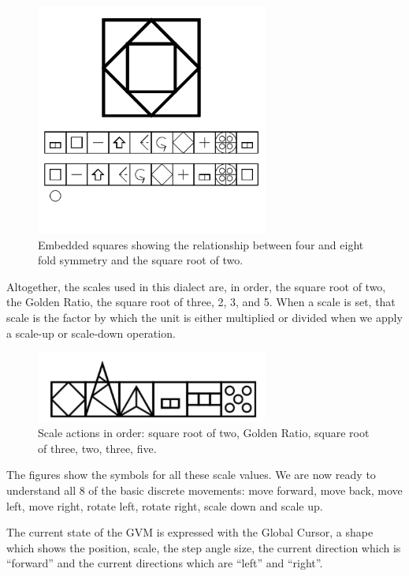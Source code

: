 \begin{figure}
	\centering
	\includegraphics[width=3in]{figures/symbol/squareroottwo.png}
	\caption[squareroottwo]
	{Embedded squares showing the relationship between four and eight fold symmetry and the square root of two.}
\end{figure}

Altogether, the scales used in this dialect are, in order, the square root of two, the Golden Ratio, the square root of three, 2, 3, and 5.  When a scale is set, that scale is the factor by which the unit is either multiplied or divided when we apply a scale-up or scale-down operation.  


\begin{figure}
	\centering
	\includegraphics[width=3in]{figures/symbol/scales.png}
	\caption[scales]
	{Scale actions in order: square root of two, Golden Ratio, square root of three, two, three, five.}
\end{figure}


The figures show the symbols for all these scale values.  We are now ready to understand all 8 of the basic discrete movements: move forward, move back, move left, move right, rotate left, rotate right, scale down and scale up.     

The current state of the GVM is expressed with the Global Cursor, a shape which shows the position, scale, the step angle size, the current direction which is ``forward'' and the current directions which are ``left'' and ``right''.

